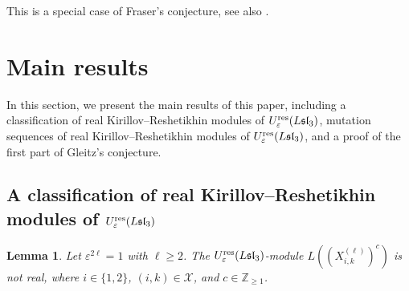 \documentclass[11pt, reqno]{amsart}
\theoremstyle{plain}
\newtheorem{lemma}[theorem]{Lemma}
\theoremstyle{definition}
\numberwithin{equation}{section}
\newcommand{\ZZ}{{\mathbb {Z}}}
\newcommand{\res}{{\rm res}}
\begin{document}
This is a special case of Fraser's conjecture, see also \cite [Section 8.2]{Fra20}.



\section{Main results}\label{Section: main result}
In this section, we present the main results of this paper, including a classification of real Kirillov--Reshetikhin modules of $U_\varepsilon^{\res}(L\mathfrak{sl}_3)$, mutation sequences of real Kirillov--Reshetikhin modules of $U_\varepsilon^\res({L\mathfrak{sl}_{3}})$, and a proof of the first part of Gleitz's conjecture.

\subsection{\texorpdfstring{A classification of real Kirillov--Reshetikhin modules of $U_\varepsilon^\res({L\mathfrak{sl}_{3}})$}{a classification of real Kirillov--Reshetikhin module}}

\begin{lemma}\label{Lem: cofficients of $A_2$ are not real}
Let $\varepsilon^{2 \ell}=1$ with $\ell\geq 2$. The $U_\varepsilon^\res({L\mathfrak{sl}_{3}})$-module $L((X^{(\ell)}_{i, k})^c)$ is not real, where $i\in\{1,2\}$, $(i,k)\in \mathcal{X}$, and $c\in\ZZ_{\geq 1}$.
\end{lemma}
\end{document}
